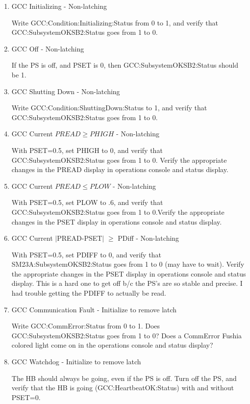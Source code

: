 \documentclass[11pt]{book}		%
\begin{document}
\begin{enumerate}
 \item GCC Initializing - Non-latching

\color{red}
Write GCC:Condition:Initializing:Status from 0 to 1, and verify that GCC:SubsystemOKSB2:Status goes from 1 to 0.
\color{black}

 \item GCC Off - Non-latching

\color{red}
If the PS is off, and PSET is 0, then GCC:SubsystemOKSB2:Status should be 1.
\color{black}

 \item GCC Shutting Down - Non-latching

\color{red}
Write GCC:Condition:ShuttingDown:Status to 1, and verify that GCC:SubsystemOKSB2:Status goes from 1 to 0.
\color{black}

 \item GCC Current $PREAD \geq PHIGH$ - Non-latching

\color{red}
With PSET=0.5, set PHIGH to 0, and verify that GCC:SubsystemOKSB2:Status goes from 1 to 0. Verify the appropriate changes in the PREAD display in operations console and status display.
\color{black}

 \item GCC Current $PREAD \leq PLOW$ - Non-latching

\color{red}
With PSET=0.5, set PLOW to .6, and verify that GCC:SubsystemOKSB2:Status goes from 1 to 0.Verify the appropriate changes in the PSET display in operations console and status display.
\color{black}

 \item GCC Current $\mid$PREAD-PSET$\mid$  $\geq$ PDiff - Non-latching

\color{red}
With PSET=0.5, set PDIFF to 0, and verify that SM23A:SubsystemOKSB2:Status goes from 1 to 0 (may have to wait). Verify the appropriate changes in the PSET display in operations console and status display. This is a hard one to get off b/c the PS's are so stable and precise. I had trouble getting the PDIFF to actually be read.
\color{black}

 \item GCC Communication Fault - Initialize to remove latch

\color{red}
Write GCC:CommError:Status from 0 to 1. Does GCC:SubsystemOKSB2:Status goes from 1 to 0? Does a CommError Fushia colored light come on in the operations console and status display?
\color{black}

 \item GCC Watchdog - Initialize to remove latch

\color{red}
The HB should always be going, even if the PS is off. Turn off the PS, and verify that the HB is going (GCC:HeartbeatOK:Status) with and without PSET=0.
\color{black}


\end{enumerate}
\end{document}

